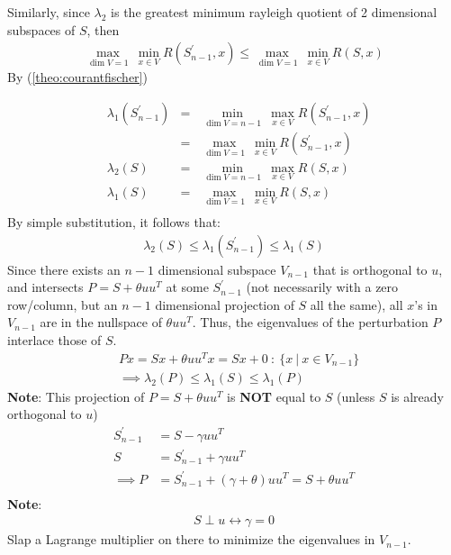 \documentclass{article}
\newcommand{\minmax}[2]{\min\limits_{#1}~\max\limits_{#2}}
\newcommand{\maxmin}[2]{\max\limits_{#1}~\min\limits_{#2}}
\newenvironment{note}{
  \begin{flushleft}
  \begin{addmargin}[2em]{2em}
}{
  \end{addmargin}
  \end{flushleft}
}
\newcommand*{\reftheo}[1]{%
  \begingroup
    \hypersetup{
      linkcolor=linktheo,
      linkbordercolor=linktheo,
    }%
    (\ref{#1})%
  \endgroup
}
\begin{document}
\begin{note}
  \newline
  \newline
  Similarly, since $\lambda_2$ is the greatest
  minimum rayleigh quotient of 2 dimensional subspaces of $S$, then
  \begin{align}
    \maxmin{\dim V=1}{x\in V}R(S^\prime_{n-1},x) \leq \maxmin{\dim V=1}{x\in V} R(S,x)
  \end{align}
  By \reftheo{theo:courantfischer}
  \begin{align*}
     & \lambda_1(S^\prime_{n-1}) & = & \minmax{\dim V=n-1}{x\in V}R(S^\prime_{n-1},x) \\
     &                           & = & \maxmin{\dim V=1}{x\in V}R(S^\prime_{n-1},x)   \\
     & \lambda_2(S)              & = & \minmax{\dim V=n-1}{x\in V} R(S,x)             \\
     & \lambda_1(S)              & = & \maxmin{\dim V=1}{x\in V} R(S,x)               \\
  \end{align*}
  By simple substitution, it follows that:
  \begin{align*}
    \lambda_2(S)\leq \lambda_1(S^\prime_{n-1})\leq \lambda_1(S)
  \end{align*}
  Since there exists an $n-1$ dimensional subspace $V_{n-1}$ that is orthogonal
  to $u$, and intersects $P=S+\theta uu^T$ at some $S^\prime_{n-1}$
  (not necessarily with a zero row/column, but an $n-1$ dimensional projection of $S$ all the same),
  all $x$'s in $V_{n-1}$ are in the nullspace of $\theta uu^T$.  Thus, the eigenvalues of
  the perturbation $P$ interlace those of $S$.
  \begin{align}
     & Px=Sx+\theta uu^Tx=Sx+0~:~\{x~|~x\in V_{n-1}\}\nonumber \\
     & \implies \lambda_2(P)\leq \lambda_1(S)\leq \lambda_1(P)
  \end{align}
  \textbf{Note}: This projection of $P=S+\theta uu^T$ is \textbf{NOT} equal to $S$ (unless $S$ is already orthogonal to $u$)
  \begin{align*}
    S^\prime_{n-1} & =S-\gamma uu^T                                      \\
    S              & =S^\prime_{n-1}+\gamma uu^T                         \\
    \implies P     & =S^\prime_{n-1}+(\gamma + \theta)uu^T=S+\theta uu^T \\
  \end{align*}
  \textbf{Note}:
  \begin{align*}
    S\perp u\leftrightarrow\gamma=0
  \end{align*}
  Slap a Lagrange multiplier on there to minimize the eigenvalues in $V_{n-1}$.
\end{note}
\end{document}
